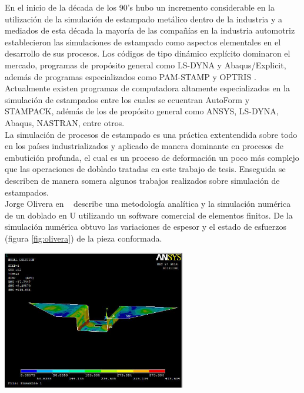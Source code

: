 En el inicio de la década de los 90's hubo un incremento considerable en la utilización de la simulación de estampado 
metálico dentro de la industria y a mediados de esta década la mayoría de las compañías en la industria automotriz 
establecieron las simulaciones de estampado como aspectos elementales en el desarrollo de sus procesos.
Los códigos de tipo dinámico explícito dominaron el mercado, programas de propósito general como LS-DYNA y 
Abaqus/Explicit, además de programas especializados como PAM-STAMP y OPTRIS \cite{banabic2000}.
Actualmente existen programas de computadora altamente especializados en la simulación de estampados entre los 
cuales se ecuentran AutoForm y STAMPACK, adémás de los de propósito general como ANSYS, LS-DYNA, Abaqus, 
NASTRAN, entre otros.\\

La simulación de procesos de estampado es una práctica extentendida sobre todo en los países industrializados y 
aplicado de manera dominante en procesos de embutición profunda, el cual es un proceso de deformación un poco 
más complejo que las operaciones de doblado tratadas en este trabajo de tesis. Enseguida se describen de 
manera somera algunos trabajos realizados sobre simulación de estampados.\\

Jorge Olivera en ~\cite{olivera2014} describe una metodología analítica y la simulación numérica de un doblado en U 
utilizando un software comercial de elementos finitos. De la simulación numérica obtuvo las variaciones de espesor 
y el estado de esfuerzos (figura \ref{fig:olivera}) de la pieza conformada.

\begin{center}
\includegraphics[width=0.6\textwidth]{src/ch1/olivera.png}
\label{fig:olivera}
\end{center}

